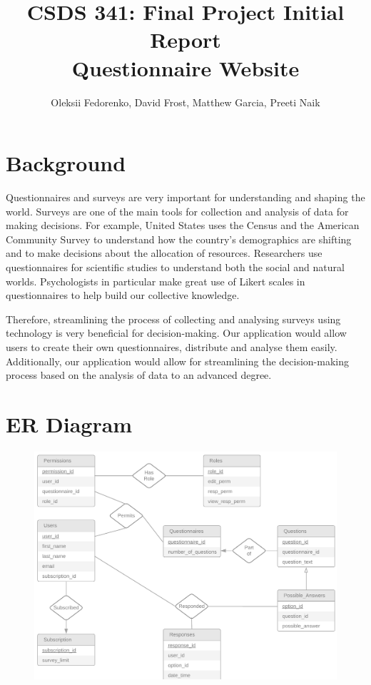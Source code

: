 \documentclass[12pt, oneside, a4paper]{article}
\title{CSDS 341: Final Project Initial Report\\ Questionnaire Website}
\author{Oleksii Fedorenko, David Frost, Matthew Garcia, Preeti Naik}
\begin{document}
 
    \maketitle
    \section{Background}
    Questionnaires and surveys are very important for understanding and shaping the world. Surveys are one of the main tools for collection and analysis of data for making decisions. For example, United States uses the Census and the American Community Survey to understand how the country's demographics are shifting and to make decisions about the allocation of resources. Researchers use questionnaires for scientific studies to understand both the social and natural worlds. Psychologists in particular make great use of Likert scales in questionnaires to help build our collective knowledge.   
    
    Therefore, streamlining the process of collecting and analysing surveys using technology is very beneficial for decision-making. Our application would allow users to create their own questionnaires, distribute and analyse them easily. Additionally, our application would allow for streamlining the decision-making process based on the analysis of data to an advanced degree.
    

    \newpage    
    \section{ER Diagram}  

    \FloatBarrier
    \begin{figure}[H] 
        \centerline{
        \includegraphics[width=\textwidth]{er_diagram.png}
        }
    \end{figure}
    
\end{document}

